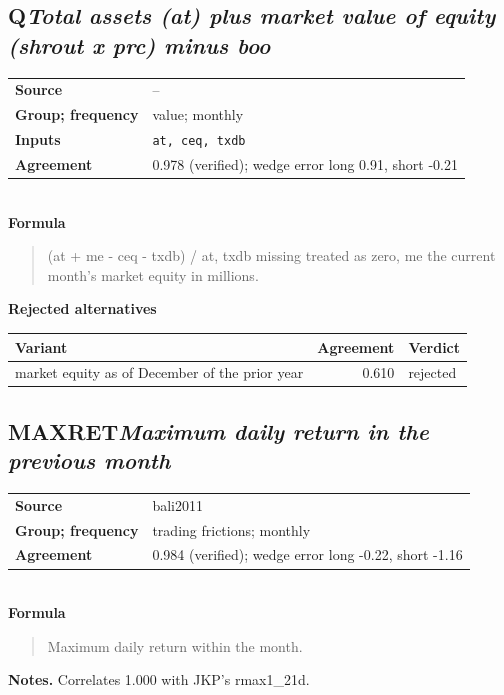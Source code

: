 \documentclass[11pt]{article}
\begin{document}
\subsection*{Q\quad\normalfont\itshape Total assets (at) plus market value of equity (shrout x prc) minus boo}
\begin{tabular}{@{}p{3.3cm}p{12.3cm}@{}}
\textbf{Source} & --\\
\textbf{Group; frequency} & value; monthly\\
\textbf{Inputs} & \texttt{at, ceq, txdb}\\
\textbf{Agreement} & 0.978 (verified); wedge error long 0.91, short -0.21\\
\end{tabular}\\[4pt]
\textbf{Formula}
\begin{quote}\small
(at + me - ceq - txdb) / at, txdb missing treated as zero, me the current month's market equity in millions.\\

\end{quote}
\textbf{Rejected alternatives}\\[2pt]
{\small\begin{longtable}{@{}p{9.6cm}rp{4.3cm}@{}}
\toprule Variant & Agreement & Verdict\\\midrule\endhead
market equity as of December of the prior year & 0.610 & rejected\\
\bottomrule\end{longtable}}
\subsection*{MAXRET\quad\normalfont\itshape Maximum daily return in the previous month}
\begin{tabular}{@{}p{3.3cm}p{12.3cm}@{}}
\textbf{Source} & bali2011\\
\textbf{Group; frequency} & trading frictions; monthly\\
\textbf{Agreement} & 0.984 (verified); wedge error long -0.22, short -1.16\\
\end{tabular}\\[4pt]
\textbf{Formula}
\begin{quote}\small
Maximum daily return within the month.\\

\end{quote}
\textbf{Notes.} Correlates 1.000 with JKP's rmax1\_21d.
\end{document}

